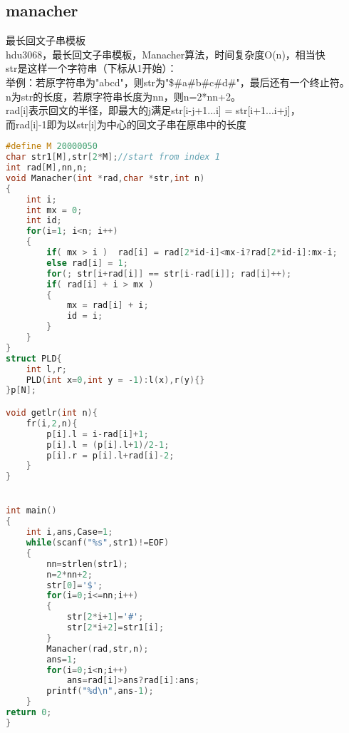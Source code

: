 \subsection{manacher}
最长回文子串模板\\
hdu3068，最长回文子串模板，Manacher算法，时间复杂度O(n)，相当快\\
str是这样一个字符串（下标从1开始）：\\
举例：若原字符串为"abcd"，则str为"\$\#a\#b\#c\#d\#"，最后还有一个终止符。\\
n为str的长度，若原字符串长度为nn，则n=2*nn+2。\\
rad[i]表示回文的半径，即最大的j满足str[i-j+1...i] = str[i+1...i+j]，\\
而rad[i]-1即为以str[i]为中心的回文子串在原串中的长度\\

		\begin{lstlisting}[language=c++]
#define M 20000050
char str1[M],str[2*M];//start from index 1
int rad[M],nn,n;
void Manacher(int *rad,char *str,int n)
{
    int i;
    int mx = 0;
    int id;
    for(i=1; i<n; i++)
    {
        if( mx > i )  rad[i] = rad[2*id-i]<mx-i?rad[2*id-i]:mx-i;        
        else rad[i] = 1;
        for(; str[i+rad[i]] == str[i-rad[i]]; rad[i]++);
        if( rad[i] + i > mx )
        {
            mx = rad[i] + i;
            id = i;
        }
    }
}
struct PLD{
	int l,r;
	PLD(int x=0,int y = -1):l(x),r(y){}
}p[N];

void getlr(int n){
	fr(i,2,n){
		p[i].l = i-rad[i]+1;
		p[i].l = (p[i].l+1)/2-1;
		p[i].r = p[i].l+rad[i]-2;
	}
}


int main()
{
	int i,ans,Case=1;
	while(scanf("%s",str1)!=EOF)
	{
		nn=strlen(str1);
		n=2*nn+2;
		str[0]='$';
		for(i=0;i<=nn;i++)
		{
			str[2*i+1]='#';
			str[2*i+2]=str1[i];
		}
		Manacher(rad,str,n);
		ans=1;
		for(i=0;i<n;i++)
			ans=rad[i]>ans?rad[i]:ans;
		printf("%d\n",ans-1);
	}
return 0;
}
		\end{lstlisting}